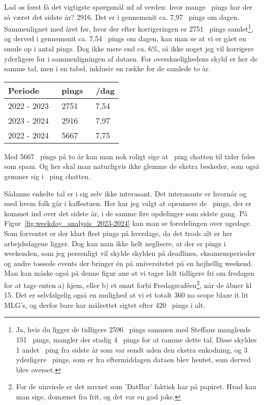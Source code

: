 \begin{article}
Lad os først få det vigtigste spørgsmål ud af verden: hvor mange \coffee\ pings har der så været det sidste år? 2916. Det er i gennemsnit ca. 7,97 \coffee\ pings om dagen. Sammenlignet med året før, hvor der efter korrigeringen er 2751 \coffee\ pings samlet\footnote{Ja, hvis du ligger de tidligere 2596 \coffee\ pings sammen med Steffans manglende 151 \coffee\ pings, mangler der stadig 4 \coffee\ pings for at ramme dette tal. Disse skyldes 1 andet \coffee\ ping fra sidste år som var sendt uden den ekstra enkodning, og 3 yderligere \coffee\ pings, som er fra eftermiddagen dataen blev hentet, som derved blev overset.}, og derved i gennemsnit ca. 7,54 \coffee\ pings om dagen, kan man se at vi er gået en smule op i antal pings. Dog ikke mere end ca. 6\%, så ikke noget jeg vil korrigere yderligere for i sammenligningen af dataen.
For overskuelighedens skyld er her de samme tal, men i en tabel, inklusiv en række for de samlede to år.
\begin{center}
	\begin{tabular}{l|c|c}
		Periode & \coffee\ pings & \coffee\ \!/dag \\ \hline
		2022 - 2023 & 2751 & 7,54 \\
		2023 - 2024 & 2916 & 7,97 \\ \hline
		2022 - 2024 & 5667 & 7,75
	\end{tabular}
\end{center}
Med 5667 \coffee\ pings på to år kan man nok roligt sige at \coffee\ ping chatten til tider føles som spam. Og her skal man naturligvis ikke glemme de ekstra beskeder, som også gemmer sig i \coffee\ ping chatten.

Sådanne enkelte tal er i sig selv ikke interasant. Det interasante er hvornår og med hvem folk går i kaffestuen.
Her har jeg valgt at opsumere de \coffee\ pings, der er kommet ind over det sidste år, i de samme fire opdelinger som sidste gang.
På Figur~\ref{fig:weekday_analysis_2023-2024} kan man se foredelingen over ugedage. Som forventet er der klart flest pings på hverdage, da det trods alt er her arbejdsdagene ligger. Dog kan man ikke helt neglisere, at der er pings i weekenden, som jeg personligt vil skylde skylden på deadlines, eksamensperioder og andre tossede events der bringer én på universitetet på en højhellig weekend.
Man kan måske også på denne figur ane at vi tager lidt tidligere fri om fredagen for at tage enten a) hjem, eller b) et smut forbi Fredagscaféen\footnote{For de uinviede er det navnet som 'DatBar' faktisk har på papiret. Hvad kan man sige, domænet fra frit, og det var en god joke.}, når de åbner kl 15.
Det er selvfølgelig også en mulighed at vi et totalt 360 no scope blaze it lit MLG's, og derfor bare har målrettet sigtet efter 420 \coffee\ pings i alt.


\end{article}
